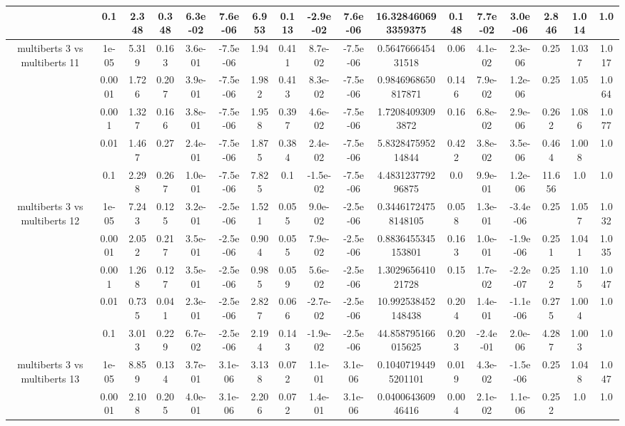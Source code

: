 \begin{tabular}{|c|c|c|c|c|c|c|c|c|c|c|c|c|c|c|c|c|}
 & 0.1 & 2.348 & 0.348 & 6.3e-02 & 7.6e-06 & 6.953 & 0.113 & -2.9e-02 & 7.6e-06 & 16.328460693359375 & 0.148 & 7.7e-02 & 3.0e-06 & 2.846 & 1.014 & 1.0 \\
\hline
\multirow{5}{*}{multiberts 3 vs multiberts 11} & 1e-05 & 5.319 & 0.163 & 3.6e-01 & -7.5e-06 & 1.94 & 0.411 & 8.7e-02 & -7.5e-06 & 0.564766645431518 & 0.06 & 4.1e-02 & 2.3e-06 & 0.25 & 1.037 & 1.017 \\
 & 0.0001 & 1.726 & 0.207 & 3.9e-01 & -7.5e-06 & 1.982 & 0.413 & 8.3e-02 & -7.5e-06 & 0.9846968650817871 & 0.146 & 7.9e-02 & 1.2e-06 & 0.25 & 1.05 & 1.064 \\
 & 0.001 & 1.327 & 0.166 & 3.8e-01 & -7.5e-06 & 1.958 & 0.397 & 4.6e-02 & -7.5e-06 & 1.72084093093872 & 0.16 & 6.8e-02 & 2.9e-06 & 0.262 & 1.086 & 1.077 \\
 & 0.01 & 1.467 & 0.27 & 2.4e-01 & -7.5e-06 & 1.875 & 0.384 & 2.4e-02 & -7.5e-06 & 5.832847595214844 & 0.422 & 3.8e-02 & 3.5e-06 & 0.464 & 1.008 & 1.0 \\
 & 0.1 & 2.298 & 0.267 & 1.0e-01 & -7.5e-06 & 7.825 & 0.1 & -1.5e-02 & -7.5e-06 & 4.483123779296875 & 0.0 & 9.9e-01 & 1.2e-06 & 11.656 & 1.0 & 1.0 \\
\hline
\multirow{5}{*}{multiberts 3 vs multiberts 12} & 1e-05 & 7.243 & 0.125 & 3.2e-01 & -2.5e-06 & 1.521 & 0.055 & 9.0e-02 & -2.5e-06 & 0.34461724758148105 & 0.058 & 1.3e-01 & -3.4e-06 & 0.25 & 1.057 & 1.032 \\
 & 0.0001 & 2.052 & 0.217 & 3.5e-01 & -2.5e-06 & 0.904 & 0.055 & 7.9e-02 & -2.5e-06 & 0.8836455345153801 & 0.163 & 1.0e-01 & -1.9e-06 & 0.251 & 1.041 & 1.035 \\
 & 0.001 & 1.268 & 0.127 & 3.5e-01 & -2.5e-06 & 0.985 & 0.059 & 5.6e-02 & -2.5e-06 & 1.302965641021728 & 0.15 & 1.7e-02 & -2.2e-07 & 0.252 & 1.105 & 1.047 \\
 & 0.01 & 0.735 & 0.041 & 2.3e-01 & -2.5e-06 & 2.827 & 0.066 & -2.7e-02 & -2.5e-06 & 10.992538452148438 & 0.204 & 1.4e-01 & -1.1e-06 & 0.275 & 1.004 & 1.0 \\
 & 0.1 & 3.013 & 0.229 & 6.7e-02 & -2.5e-06 & 2.194 & 0.143 & -1.9e-02 & -2.5e-06 & 44.858795166015625 & 0.203 & -2.4e-01 & 2.0e-06 & 4.287 & 1.003 & 1.0 \\
\hline
\multirow{5}{*}{multiberts 3 vs multiberts 13} & 1e-05 & 8.859 & 0.134 & 3.7e-01 & 3.1e-06 & 3.138 & 0.072 & 1.1e-01 & 3.1e-06 & 0.10407194495201101 & 0.019 & 4.3e-02 & -1.5e-06 & 0.25 & 1.048 & 1.047 \\
 & 0.0001 & 2.108 & 0.205 & 4.0e-01 & 3.1e-06 & 2.206 & 0.072 & 1.4e-01 & 3.1e-06 & 0.040064360946416 & 0.004 & 2.1e-02 & 1.1e-06 & 0.252 & 1.0 & 1.0 \\

\end{tabular}
